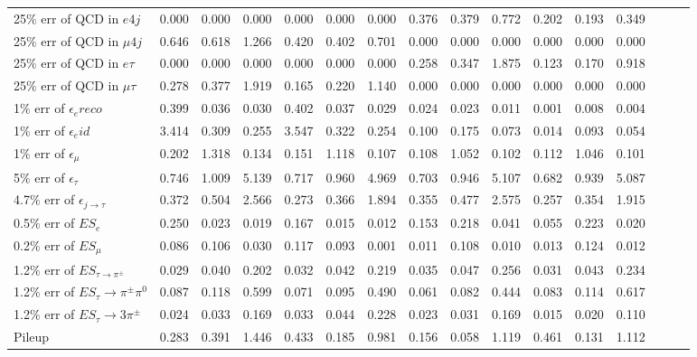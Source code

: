 \begin{sidewaystable}[p]
\begin{tabular}{|l|ccc|ccc|ccc|ccc|ccc|}
  25$\%$ err of QCD in $e 4j$                & 0.000 & 0.000 & 0.000 & 0.000 & 0.000 & 0.000 & 0.376 & 0.379 & 0.772 & 0.202 & 0.193 & 0.349 \\ 
  25$\%$ err of QCD in $\mu 4j$              & 0.646 & 0.618 & 1.266 & 0.420 & 0.402 & 0.701 & 0.000 & 0.000 & 0.000 & 0.000 & 0.000 & 0.000 \\ 
  25$\%$ err of QCD in $e\tau$               & 0.000 & 0.000 & 0.000 & 0.000 & 0.000 & 0.000 & 0.258 & 0.347 & 1.875 & 0.123 & 0.170 & 0.918 \\ 
  25$\%$ err of QCD in $\mu\tau$             & 0.278 & 0.377 & 1.919 & 0.165 & 0.220 & 1.140 & 0.000 & 0.000 & 0.000 & 0.000 & 0.000 & 0.000 \\ 
  1$\%$ err of $\epsilon_e reco$             & 0.399 & 0.036 & 0.030 & 0.402 & 0.037 & 0.029 & 0.024 & 0.023 & 0.011 & 0.001 & 0.008 & 0.004 \\ 
  1$\%$ err of $\epsilon_e id$               & 3.414 & 0.309 & 0.255 & 3.547 & 0.322 & 0.254 & 0.100 & 0.175 & 0.073 & 0.014 & 0.093 & 0.054 \\ 
  1$\%$ err of $\epsilon_\mu$                & 0.202 & 1.318 & 0.134 & 0.151 & 1.118 & 0.107 & 0.108 & 1.052 & 0.102 & 0.112 & 1.046 & 0.101 \\ 
  5$\%$ err of $\epsilon_\tau$               & 0.746 & 1.009 & 5.139 & 0.717 & 0.960 & 4.969 & 0.703 & 0.946 & 5.107 & 0.682 & 0.939 & 5.087 \\ 
  4.7$\%$ err of $\epsilon_{j\to\tau}$       & 0.372 & 0.504 & 2.566 & 0.273 & 0.366 & 1.894 & 0.355 & 0.477 & 2.575 & 0.257 & 0.354 & 1.915 \\ 
  0.5$\%$ err of $ES_{e}$                    & 0.250 & 0.023 & 0.019 & 0.167 & 0.015 & 0.012 & 0.153 & 0.218 & 0.041 & 0.055 & 0.223 & 0.020 \\ 
  0.2$\%$ err of $ES_{\mu}$                  & 0.086 & 0.106 & 0.030 & 0.117 & 0.093 & 0.001 & 0.011 & 0.108 & 0.010 & 0.013 & 0.124 & 0.012 \\ 
  1.2$\%$ err of $ES_{\tau\to\pi^\pm}$       & 0.029 & 0.040 & 0.202 & 0.032 & 0.042 & 0.219 & 0.035 & 0.047 & 0.256 & 0.031 & 0.043 & 0.234 \\ 
  1.2$\%$ err of $ES_{\tau}\to\pi^\pm\pi^0$  & 0.087 & 0.118 & 0.599 & 0.071 & 0.095 & 0.490 & 0.061 & 0.082 & 0.444 & 0.083 & 0.114 & 0.617 \\ 
  1.2$\%$ err of $ES_{\tau}\to3\pi^\pm$      & 0.024 & 0.033 & 0.169 & 0.033 & 0.044 & 0.228 & 0.023 & 0.031 & 0.169 & 0.015 & 0.020 & 0.110 \\ 
  Pileup                                     & 0.283 & 0.391 & 1.446 & 0.433 & 0.185 & 0.981 & 0.156 & 0.058 & 1.119 & 0.461 & 0.131 & 1.112 \\ 

\end{tabular}
\end{sidewaystable}
